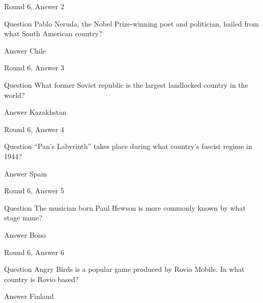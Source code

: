 \documentclass[11pt]{beamer}
\begin{document}
\begin{frame}[t]{Round 6, Answer 2}
\vspace{2em}
\begin{block}{Question}
Pablo Neruda, the Nobel Prize-winning poet and politician, hailed from what South American country\@?
\end{block}
\pause{}
\begin{block}{Answer}
Chile
\end{block}
\end{frame}
    

\begin{frame}[t]{Round 6, Answer 3}
\vspace{2em}
\begin{block}{Question}
What former Soviet republic is the largest landlocked country in the world\@?
\end{block}
\pause{}
\begin{block}{Answer}
Kazakhstan
\end{block}
\end{frame}
    

\begin{frame}[t]{Round 6, Answer 4}
\vspace{2em}
\begin{block}{Question}
``Pan's Labyrinth'' takes place during what country's fascist regime in 1944\@?
\end{block}
\pause{}
\begin{block}{Answer}
Spain
\end{block}
\end{frame}
    

\begin{frame}[t]{Round 6, Answer 5}
\vspace{2em}
\begin{block}{Question}
The musician born Paul Hewson is more commonly known by what stage name\@?
\end{block}
\pause{}
\begin{block}{Answer}
Bono
\end{block}
\end{frame}
    

\begin{frame}[t]{Round 6, Answer 6}
\vspace{2em}
\begin{block}{Question}
Angry Birds is a popular game produced by Rovio Mobile. In what country is Rovio based\@?
\end{block}
\pause{}
\begin{block}{Answer}
Finland
\end{block}
\end{frame}
    
\end{document}
